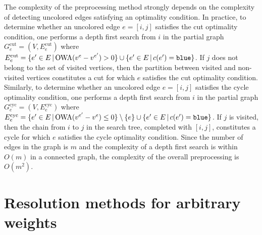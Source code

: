 \documentclass[final,3p,times]{elsarticle}
\newcommand{\owa}{\mbox{OWA}}
\newcommand{\blue}{\mbox{\tt blue}}
\begin{document}
The complexity of the preprocessing method strongly depends on the complexity of
detecting uncolored edges satisfying an optimality condition. In practice,
to determine whether an uncolored edge $e = [i,j]$ satisfies the cut
optimality condition, one performs a depth first search from $i$ in the
partial graph $G^\text{cut}_e = (V,E^\text{cut}_e)$ where $E^\text{cut}_e
= \{e' \in E\,|\,\owa(v^e-v^{e'})>0\} \cup \{e' \in E\,|\,c(e') =
\mbox{\blue}\}$. If $j$ does not belong to the set of visited vertices, then the
partition between visited and non-visited vertices constitutes a cut for
which $e$ satisfies the cut optimality condition. Similarly, to determine
whether an uncolored edge $e = [i,j]$ satisfies the cycle optimality
condition, one performs a depth first search from $i$ in the partial graph
$G^\text{cyc}_e = (V,E^\text{cyc}_e)$ where $E^\text{cyc}_e = \{e' \in
E\,|\,\owa(v^{e'}-v^e) \le 0\}\setminus \{e\} \cup \{e' \in E\,|\,c(e') =
\mbox{\blue}\}$. If $j$ is visited, then the chain from $i$ to $j$ in the
search tree, completed with $[i,j]$, constitutes a cycle for which $e$
satisfies the cycle optimality condition. Since the number of edges in the
graph is $m$ and the complexity of a depth first search is within $O(m)$
in a connected graph, the complexity of the overall preprocessing is $O(m^2)$.

\section{Resolution methods for arbitrary weights}\label{sec:Bounds}
\end{document}
